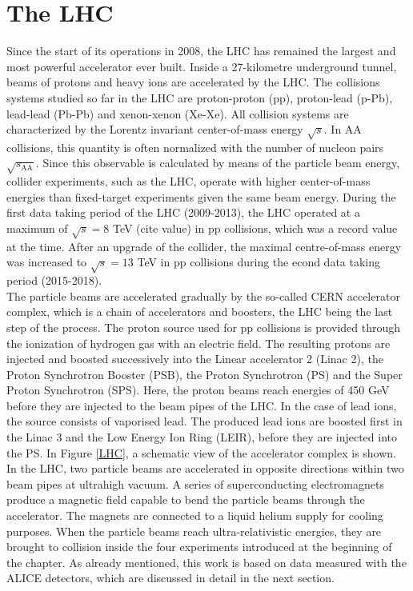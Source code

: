 \documentclass[12pt,a4paper]{report}
\begin{document}
\section{The LHC}
Since the start of its operations in 2008, the LHC has remained the largest and most powerful accelerator ever built. Inside a 27-kilometre underground tunnel, beams of protons and heavy ions are accelerated by the LHC. The collisions systems studied so far in the LHC are proton-proton (pp), proton-lead (p-Pb), lead-lead (Pb-Pb) and xenon-xenon (Xe-Xe). All collision systems are characterized by the Lorentz invariant center-of-mass energy $\sqrt{s}$. In AA collisions, this quantity is often normalized with the number of nucleon pairs $\sqrt{s_\text{AA}}$. Since this observable is calculated by means of the particle beam energy, collider experiments, such as the LHC, operate with higher center-of-mass energies than fixed-target experiments given the same beam energy. During the first data taking period of the LHC (2009-2013), the LHC operated at a maximum of $\sqrt{s} = 8$ TeV (cite value) in pp collisions, which was a record value at the time. After an upgrade of the collider, the maximal centre-of-mass energy was increased to $\sqrt{s} = 13$ TeV in pp collisions during the econd data taking period (2015-2018).\\ 
The particle beams are accelerated gradually by the so-called CERN accelerator complex, which is a chain of accelerators and boosters, the LHC being the last step of the process. The proton source used for pp collisions is provided through the ionization of hydrogen gas with an electric field. The resulting protons are injected and boosted successively into the Linear accelerator 2 (Linac 2), the Proton Synchrotron Booster (PSB), the Proton Synchrotron (PS) and the  Super Proton Synchrotron (SPS). Here, the proton beams reach energies of 450 GeV before they are injected to the beam pipes of the LHC. In the case of lead ions, the source consists of vaporised lead. The produced lead ions are boosted first in the Linac 3 and the Low Energy Ion Ring (LEIR), before they are injected into the PS. In Figure \ref{LHC}, a schematic view of the accelerator complex is shown. \\
In the LHC, two particle beams are accelerated in opposite directions within two beam pipes at ultrahigh vacuum. A series of superconducting electromagnets produce a magnetic field capable to bend the particle beams through the accelerator. The magnets are connected to a liquid helium supply for cooling purposes. When the particle beams reach ultra-relativistic energies, they are brought to collision inside the four experiments introduced at the beginning of the chapter. As already mentioned, this work is based on data measured with the ALICE detectors, which are discussed in detail in the next section.
\end{document}

